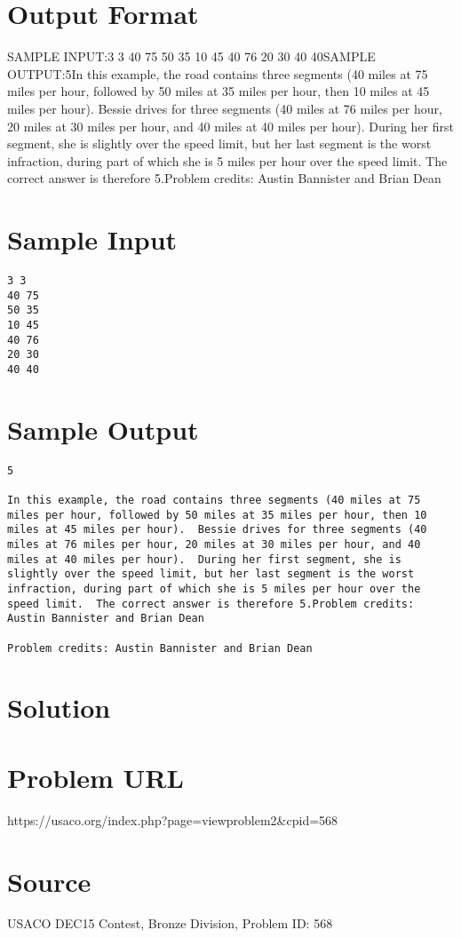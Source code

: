 \documentclass[12pt]{article}
\begin{document}
\section*{Output Format}
SAMPLE INPUT:3 3
40 75
50 35
10 45
40 76
20 30
40 40SAMPLE OUTPUT:5In this example, the road contains three segments (40 miles at 75
miles per hour, followed by 50 miles at 35 miles per hour, then 10
miles at 45 miles per hour).  Bessie drives for three segments (40
miles at 76 miles per hour, 20 miles at 30 miles per hour, and 40
miles at 40 miles per hour).  During her first segment, she is
slightly over the speed limit, but her last segment is the worst
infraction, during part of which she is 5 miles per hour over the
speed limit.  The correct answer is therefore 5.Problem credits: Austin Bannister and Brian Dean

\section*{Sample Input}
\begin{verbatim}
3 3
40 75
50 35
10 45
40 76
20 30
40 40
\end{verbatim}

\section*{Sample Output}
\begin{verbatim}
5

In this example, the road contains three segments (40 miles at 75
miles per hour, followed by 50 miles at 35 miles per hour, then 10
miles at 45 miles per hour).  Bessie drives for three segments (40
miles at 76 miles per hour, 20 miles at 30 miles per hour, and 40
miles at 40 miles per hour).  During her first segment, she is
slightly over the speed limit, but her last segment is the worst
infraction, during part of which she is 5 miles per hour over the
speed limit.  The correct answer is therefore 5.Problem credits: Austin Bannister and Brian Dean

Problem credits: Austin Bannister and Brian Dean
\end{verbatim}

\section*{Solution}


\section*{Problem URL}
https://usaco.org/index.php?page=viewproblem2&cpid=568

\section*{Source}
USACO DEC15 Contest, Bronze Division, Problem ID: 568
\end{document}
